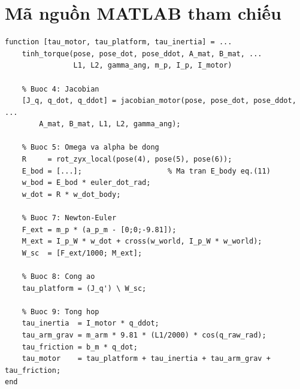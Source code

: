 \documentclass[12pt,a4paper]{article}
\begin{document}
\section{Mã nguồn MATLAB tham chiếu}
\begin{lstlisting}[caption={Ham tinh moment tong --- tinh\_torque.m (luoc trich)}]
function [tau_motor, tau_platform, tau_inertia] = ...
    tinh_torque(pose, pose_dot, pose_ddot, A_mat, B_mat, ...
                L1, L2, gamma_ang, m_p, I_p, I_motor)

    % Buoc 4: Jacobian
    [J_q, q_dot, q_ddot] = jacobian_motor(pose, pose_dot, pose_ddot, ...
        A_mat, B_mat, L1, L2, gamma_ang);

    % Buoc 5: Omega va alpha be dong
    R     = rot_zyx_local(pose(4), pose(5), pose(6));
    E_bod = [...];                    % Ma tran E_body eq.(11)
    w_bod = E_bod * euler_dot_rad;
    w_dot = R * w_dot_body;

    % Buoc 7: Newton-Euler
    F_ext = m_p * (a_p_m - [0;0;-9.81]);
    M_ext = I_p_W * w_dot + cross(w_world, I_p_W * w_world);
    W_sc  = [F_ext/1000; M_ext];

    % Buoc 8: Cong ao
    tau_platform = (J_q') \ W_sc;

    % Buoc 9: Tong hop
    tau_inertia  = I_motor * q_ddot;
    tau_arm_grav = m_arm * 9.81 * (L1/2000) * cos(q_raw_rad);
    tau_friction = b_m * q_dot;
    tau_motor    = tau_platform + tau_inertia + tau_arm_grav + tau_friction;
end
\end{lstlisting}
\end{document}
